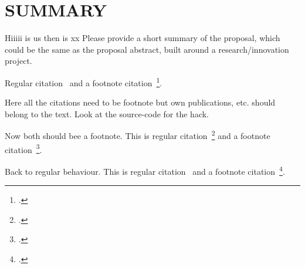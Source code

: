 \documentclass[a4paper,11pt]{article}
\begin{document}


\newpage
\setcounter{tocdepth}{1}
\setcounter{section}{-1}
\tableofcontents



\newpage
\section{SUMMARY}
\label{sec:summary}
Hiiiii \us is \ac{us} then \us is xx
Please provide a short summary of the proposal, which could be the same as the proposal abstract, built around a research/innovation project.

Regular citation~\cite{Xarticle} and a footnote citation~\footcite{Xbook}.

Here all the citations need to be footnote but own publications, etc. should belong to the text.
Look at the source-code for the hack.

\let\citeBk=\cite
\let\cite=\footcite

Now both should bee a footnote. This is regular citation~\cite{Xarticle_full} and a footnote citation~\footcite{Xbook_full}.

\let\cite=\citeBk

Back to regular behaviour. This is regular citation~\cite{Xarticle_full} and a footnote citation~\footcite{Xbook_full}.


% 


\end{document}
